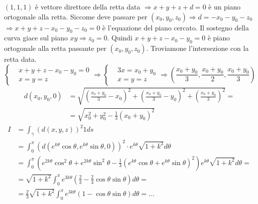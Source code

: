 \begin{exbar}
\begin{example}
	$(1,1,1)$ è vettore direttore della retta data $\Rightarrow x+y+z+d=0$ è un piano ortogonale alla retta. Siccome deve passare per $(x_0,y_0,z_0) \Rightarrow d= -x_0-y_0-z_0$ $\Rightarrow x+y+z-x_0-y_0-z_0=0$ è l'equazione del piano cercato. Il sostegno della curva giace sul piano $xy \Rightarrow z_0=0$. Quindi $x+y+z-x_0-y_0=0$ è piano ortogonale alla retta passante per $(x_0,y_0,z_0)$. Troviamone l'intersezione con la retta data.
	\begin{equation*}
		\begin{cases}
			&x+y+z-x_0-y_0=0
			\\
			& x=y=z
		\end{cases}\Rightarrow 
		\begin{cases}
			&3x = x_0+y_0\\
			&x=y=z
		\end{cases}\Rightarrow \left( \frac{x_0+y_0}{3},\frac{x_0+y_0}{2}, \frac{x_0+y_0}{3} \right)
	\end{equation*}
	\begin{align*}
		d(x_0,y_0,0)
		&=\sqrt{\left( \frac{x_0+y_0}{3}-x_0 \right)^2+\left( \frac{x_0+y_0}{3}-y_0 \right)^2 + \left( \frac{x_0+y_0}{3} \right)^2}=
		\\
		&=\sqrt{x_0^2+y_0^2-\frac{1}{3}(x_0+y_0)^2}
	\end{align*}
	\begin{align*}
		I&=\int_{\overline{\gamma}}(d(x,y,z))^2 1 ds\\
		&= \int_0^{\pi} (d(e^{k\theta}\cos \theta, e^{k\theta}\sin \theta,0))^2\cdot e^{k\theta}\sqrt{1+k^2}d\theta\\
		&=\int_0^\pi \left( e^{2k\theta} \cos^2 \theta + e^{2k\theta}\sin^2 \theta - \frac{1}{3}\left( e^{k\theta}\cos \theta + e^{k\theta}\sin \theta \right)^2 \right)e^{k\theta} \sqrt{1+k^2}d\theta=\\
		&=\sqrt{1+k^2}\int_0^\pi e^{3k\theta} \left( \frac{2}{3}-\frac{2}{3}\cos\theta \sin \theta \right) d \theta=\\
		&=\frac{2}{3}\sqrt{1+k^2}\int_0^\pi e^{3k\theta} (1-\cos \theta \sin \theta) d\theta=...
	\end{align*}
\end{example}
\end{exbar}


